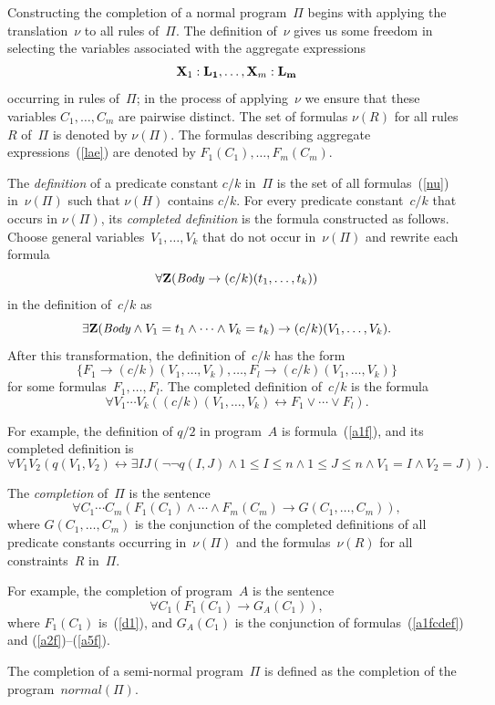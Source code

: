 \documentclass[11pt]{article}
\def\lrar{\leftrightarrow}
\def\beq{\begin{equation}}
\def\eeq#1{\label{#1}\end{equation}}
\def\bfx{{\bf X}}
\begin{document}
\begin{adjustwidth}{-1cm}{-1cm}
Constructing the completion of a normal program~$\Pi$ begins with applying
the translation~$\nu$ to all rules of~$\Pi$.  The definition
of~$\nu$ gives us some freedom in selecting the variables associated with the 
aggregate expressions
\beq
\bfx_1:{\bf L_1},\dots,\bfx_m:{\bf L_m}
\eeq{lae}
occurring in rules of~$\Pi$; in the process of applying~$\nu$ we ensure
that these variables $C_1,\dots,C_m$ are pairwise distinct.  The set
of formulas $\nu(R)$ for all rules~$R$ of~$\Pi$ is denoted by $\nu(\Pi)$.
The formulas describing aggregate expressions~(\ref{lae}) are denoted by
$F_1(C_1),\dots,F_m(C_m)$.

The \emph{definition} of a predicate constant $c/k$ in~$\Pi$ is the
set of all formulas~(\ref{nu}) in~$\nu(\Pi)$ such that $\nu(H)$ contains $c/k$.
For every predicate constant~$c/k$ that occurs in $\nu(\Pi)$, its
\emph{completed definition} is the formula constructed as follows.
Choose general variables~$V_1,\dots,V_k$ that do not occur in~$\nu(\Pi)$
and rewrite each formula
$$\forall {\bf Z}(\mathit{Body} \to (c/k)(t_1,\dots,t_k))$$
in the definition of~$c/k$ as
$$\exists{\bf Z} (\mathit{Body}\land V_1=t_1\land\cdots
\land V_k=t_k) \to (c/k)(V_1,\dots,V_k).$$
After this transformation, the definition of~$c/k$ has the form
$$\{F_1 \to (c/k)(V_1,\dots,V_k),\dots,F_l \to (c/k)(V_1,\dots,V_k)\}$$
for some formulas~$F_1,\dots,F_l$.
The completed definition of~$c/k$ is the formula
$$\forall V_1\cdots V_k ((c/k)(V_1,\dots,V_k) \lrar F_1\lor\cdots\lor F_l).$$

For example, the definition of $q/2$ in program~$A$ is formula~(\ref{a1f}),
and its completed definition is
\beq
\forall V_1V_2(q(V_1,V_2)\lrar 
\exists I J(\neg\neg q(I,J) \land 1\leq I \leq n \land 1 \leq J \leq n
\land V_1=I\land V_2=J)).
\eeq{a1fcdef}

The \emph{completion} of~$\Pi$ is the sentence
$$\forall C_1\cdots C_m (F_1(C_1)\land\cdots\land F_m(C_m)
\to G(C_1,\dots,C_m)),$$
where $G(C_1,\dots,C_m)$ is the conjunction of the completed definitions
of all predicate constants occurring in~$\nu(\Pi)$ and the formulas~$\nu(R)$
for all constraints~$R$ in~$\Pi$.

For example, the completion of program~$A$ is the sentence
$$\forall C_1(F_1(C_1) \to G_A(C_1)),$$
where $F_1(C_1)$ is~(\ref{d1}), and $G_A(C_1)$ is the conjunction of
formulas~(\ref{a1fcdef}) and (\ref{a2f})--(\ref{a5f}).



The completion of a semi-normal program~$\Pi$ is defined as the completion
of the program~$\mathit{normal}(\Pi)$.


\end{adjustwidth}
\end{document}

